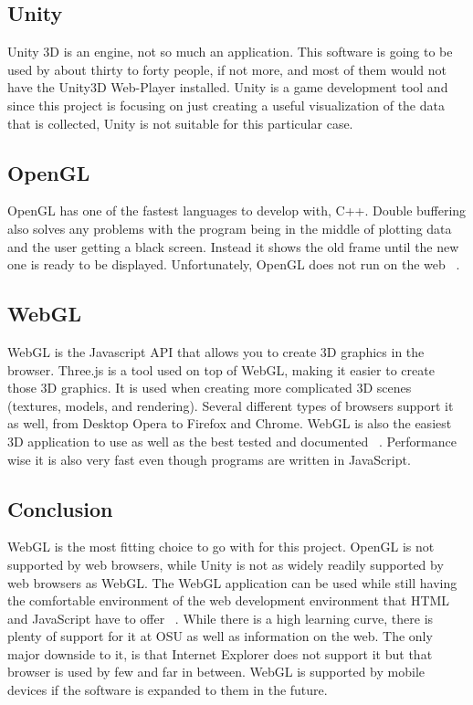 \documentclass[10pt,draftclsnofoot,onecolumn]{IEEEtran}
\begin{document}
	\subsection{Unity}
	Unity 3D is an engine, not so much an application. 
	This software is going to be used by about thirty to forty people, if not more, and most of them would not have the
	Unity3D Web-Player installed. 
	Unity is a game development tool and since this project is focusing on just creating a useful visualization of the 
	data that is collected, Unity is not suitable for this particular case.
	
	\subsection{OpenGL}
	OpenGL has one of the fastest languages to develop with, C++. 
	Double buffering also solves any problems with the program being in the middle of plotting data and the user getting
	a black screen. 
	Instead it shows the old frame until the new one is ready to be displayed. 
	Unfortunately, OpenGL does not run on the web ~\cite{why-you-should-use-webgl}.
	
	\subsection{WebGL}
	WebGL is the Javascript API that allows you to create 3D graphics in the browser. 
	Three.js is a tool used on top of WebGL, making it easier to create those 3D graphics. 
	It is used when creating more complicated 3D scenes (textures, models, and rendering). 
	Several different types of browsers support it as well, from Desktop Opera to Firefox and Chrome. 
	WebGL is also the easiest 3D application to use as well as the best tested and documented ~\cite{webgl-best-practices}. 
	Performance wise it is also very fast even though programs are written in JavaScript. 
	
	\subsection{Conclusion}
	WebGL is the most fitting choice to go with for this project.
	OpenGL is not supported by web browsers, while Unity is not as widely readily supported by web browsers as WebGL.
	The WebGL application can be used while still having the comfortable environment of the web development
	environment that HTML and JavaScript have to offer ~\cite{why-use-webgl-for-graphics-research}. 
	While there is a high learning curve, there is plenty of support for it at OSU as well as information on the web.
	The only major downside to it, is that Internet Explorer does not support it but that browser is used by few and 
	far in between. 
	WebGL is supported by mobile devices if the software is expanded to them in the future.
	
\end{document}
